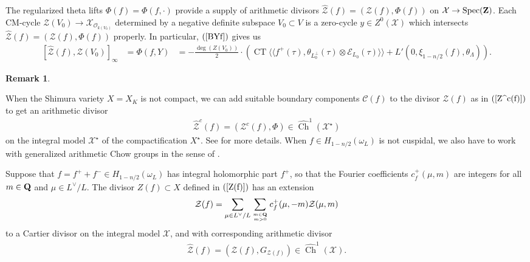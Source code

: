 \documentclass{amsart}
\theoremstyle{definition}
\theoremstyle{definition}
\theoremstyle{definition}
\newtheorem{remark}[theorem]{Remark}
\begin{document}
The regularized theta lifts $\Phi(f) = \Phi(f, \cdot)$ provide a supply of arithmetic divisors 
$\widehat{\mathcal{Z}}(f) = (\mathcal{Z}(f), \Phi(f))$ on $\mathcal{X} \rightarrow \operatorname{Spec}({\bf{Z}})$. 
Each CM-cycle $\mathcal{Z}(V_0) \longrightarrow \mathcal{X}_{\mathcal{O}_{k(V_0)}}$ determined by a negative definite subspace $V_0 \subset V$ 
is a zero-cycle $y \in Z^0(\mathcal{X})$ which intersects $\widehat{\mathcal{Z}}(f) = (\mathcal{Z}(f), \Phi(f))$ properly. 
In particular, $(\ref{BYf})$ gives us
\begin{equation}\begin{aligned}\label{BYf2} \left[ \widehat{\mathcal{Z}}(f), \mathcal{Z}(V_0) \right]_{\infty} &= \Phi(f, Y) 
&= - \frac{\deg( Z(V_0) )}{2} \cdot \left(   \operatorname{CT}  \langle\langle f^+(\tau), \theta_{L_0^{\perp}}(\tau) 
\otimes \mathcal{E}_{L_0}(\tau) \rangle\rangle + L'(0, \xi_{1-n/2}(f), \theta_{\Lambda})  \right). \end{aligned}\end{equation}

\begin{remark}\label{boundary} 

When the Shimura variety $X = X_K$ is not compact, we can add suitable boundary components 
$\mathcal{C}(f)$ to the divisor $\mathcal{Z}(f)$ as in $(\ref{Z^c(f)})$ to get an arithmetic divisor
\begin{align*} \widehat{\mathcal{Z}}^c(f) = (\mathcal{Z}^c(f), \Phi) \in \widehat{\operatorname{Ch}}^1(\mathcal{X}^{\star})\end{align*}
on the integral model $\mathcal{X}^{\star}$ of the compactification $X^{\star}$. See \cite[$\S$5-7]{BY} for more details. 
When $f \in H_{1-n/2}(\omega_L)$ is not cuspidal, we also have to work with generalized arithmetic Chow groups in the sense of \cite{BKK}. \end{remark}

Suppose that $f = f^+ + f^- \in H_{1-n/2}(\omega_L)$ has integral holomorphic part $f^+$, so that the Fourier coefficients 
$c_f^+(\mu, m)$ are integers for all $m \in {\bf{Q}}$ and $\mu \in L^{\vee}/L$. The divisor $Z(f) \subset X$ defined in $(\ref{Z(f)})$ has an extension
\begin{align*} \mathcal{Z}(f) = \sum\limits_{\mu \in L^{\vee}/L} \sum\limits_{m \in {\bf{Q}} \atop m > 0} c_f^+(\mu, -m) \mathcal{Z}(\mu, m)\end{align*}
to a Cartier divisor on the integral model $\mathcal{X}$, and with corresponding arithmetic divisor 
\begin{align*} \widehat{\mathcal{Z}}(f) = (\mathcal{Z}(f), G_{\mathcal{Z}(f)}) \in \widehat{\operatorname{Ch}}^1(\mathcal{X}). \end{align*}
\end{document}
